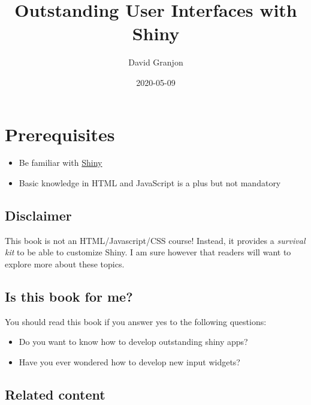 \documentclass[]{book}
\title{Outstanding User Interfaces with Shiny}
\author{David Granjon}
\date{2020-05-09}
\providecommand{\tightlist}{%
  \setlength{\itemsep}{0pt}\setlength{\parskip}{0pt}}
\begin{document}
\maketitle

{
\setcounter{tocdepth}{1}
\tableofcontents
}
\hypertarget{prerequisites}{%
\chapter*{Prerequisites}\label{prerequisites}}

\begin{itemize}
\tightlist
\item
  Be familiar with \href{https://mastering-shiny.org}{Shiny}
\item
  Basic knowledge in HTML and JavaScript is a plus but not mandatory
\end{itemize}

\hypertarget{disclaimer}{%
\section*{Disclaimer}\label{disclaimer}}

This book is not an HTML/Javascript/CSS course! Instead, it provides a \emph{survival kit} to be able to customize Shiny. I am sure however that readers will want to explore more about these topics.

\hypertarget{is-this-book-for-me}{%
\section*{Is this book for me?}\label{is-this-book-for-me}}

You should read this book if you answer yes to the following questions:

\begin{itemize}
\tightlist
\item
  Do you want to know how to develop outstanding shiny apps?
\item
  Have you ever wondered how to develop new input widgets?
\end{itemize}

\hypertarget{related-content}{%
\section*{Related content}\label{related-content}}
\end{document}
